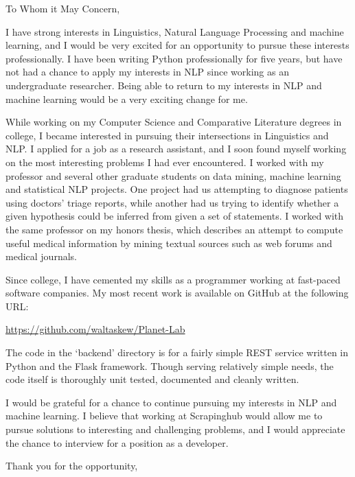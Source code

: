 \documentclass{letter}
\begin{document}
\signature{Walter Askew\\
1221 Washtenaw Apt 3R\\
Chicago, IL 60622}

\begin{letter}{}

\opening{To Whom it May Concern,}

I have strong interests in Linguistics, Natural Language
Processing and machine learning, and I would be very excited for an
opportunity to pursue these interests professionally.
I have been writing Python professionally for five years, but have not
had a chance to apply my interests in NLP since working as an
undergraduate researcher.
Being able to return to my interests in NLP and machine learning would
be a very exciting change for me.

While working on my Computer Science and Comparative Literature
degrees in college, I became interested in pursuing their intersections
in Linguistics and NLP.
I applied for a job as a research assistant, and I soon found myself
working on the most interesting problems I had ever encountered.
I worked with my professor and several other graduate students on data
mining, machine learning and statistical NLP projects.
One project had us attempting to diagnose patients using doctors'
triage reports, while another had us trying to identify whether a
given hypothesis could be inferred from given a set of statements.
I worked with the same professor on my honors thesis, which describes
an attempt to compute useful medical information by mining textual
sources such as web forums and medical journals.

Since college, I have cemented my skills as a programmer working at
fast-paced software companies.
My most recent work is available on GitHub at the following URL:

\href{https://github.com/waltaskew/Planet-Lab}
     {https://github.com/waltaskew/Planet-Lab}

The code in the `backend' directory is for a fairly simple REST
service written in Python and the Flask framework.
Though serving relatively simple needs, the code itself is
thoroughly unit tested, documented and cleanly written.

I would be grateful for a chance to continue pursuing my interests in
NLP and machine learning.
I believe that working at Scrapinghub would allow me to pursue
solutions to interesting and challenging problems, and I would
appreciate the chance to interview for a position as a developer.

\closing{Thank you for the opportunity,}
\end{letter}
\end{document}
